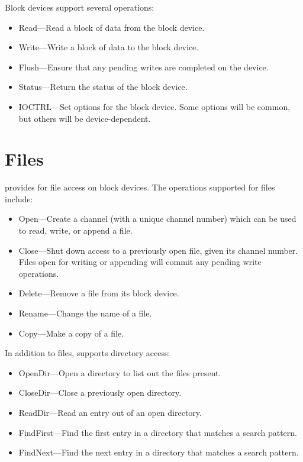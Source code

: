 \documentclass{report}
\begin{document}
Block devices support several operations:

\begin{itemize}
    \item Read---Read a block of data from the block device.

    \item Write---Write a block of data to the block device.

    \item Flush---Ensure that any pending writes are completed on the device.

    \item Status---Return the status of the block device.

    \item IOCTRL---Set options for the block device. Some options will be common, but others will be device-dependent.
\end{itemize}

\section{Files}

{\MCP} provides for file access on block devices. The operations supported for files include:

\begin{itemize}
    \item Open---Create a channel (with a unique channel number) which can be used to read, write, or append a file.

    \item Close---Shut down access to a previously open file, given its channel number. Files open for writing or appending will commit any pending write operations.

    \item Delete---Remove a file from its block device.

    \item Rename---Change the name of a file.

    \item Copy---Make a copy of a file.
\end{itemize}

In addition to files, {\MCP} supports directory access:

\begin{itemize}
    \item OpenDir---Open a directory to list out the files present.

    \item CloseDir---Close a previously open directory.

    \item ReadDir---Read an entry out of an open directory.

    \item FindFirst---Find the first entry in a directory that matches a search pattern.

    \item FindNext---Find the next entry in a directory that matches a search pattern.
\end{itemize}
\end{document}
